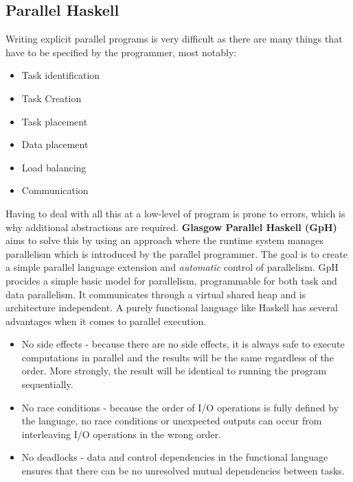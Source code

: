 \documentclass[CS4204-Notes.tex]{subfiles}
\begin{document}
\subsection{Parallel Haskell}
Writing explicit parallel programs is very difficult as there are many things that have to be specified by the programmer, most notably:
\begin{itemize}
\item Task identification
\item Task Creation
\item Task placement
\item Data placement
\item Load balancing
\item Communication
\end{itemize}
Having to deal with all this at a low-level of program is prone to errors, which is why additional abstractions are required. \textbf{Glasgow Parallel Haskell (GpH)} aims to solve this by using an approach where the runtime system manages parallelism which is introduced by the parallel programmer. The goal is to create a simple parallel language extension and \textit{automatic} control of parallelism. GpH procides a simple basic model for parallelism, programmable for both task and data parallelism. It communicates through a virtual shared heap and is architecture independent. 
\n
A purely functional language like Haskell has several advantages when it comes to parallel execution.
\begin{itemize}
\item No side effects - because there are no side effects, it is always safe to execute computations in parallel and the results will be the same regardless of the order. More strongly, the result will be identical to running the program sequentially.
\item No race conditions - because the order of I/O operations is fully defined by the language, no race conditions or unexpected outputs can occur from interleaving I/O operations in the wrong order.
\item No deadlocks - data and control dependencies in the functional language ensures that there can be no unresolved mutual dependencies between tasks.
\end{itemize}
\end{document}
